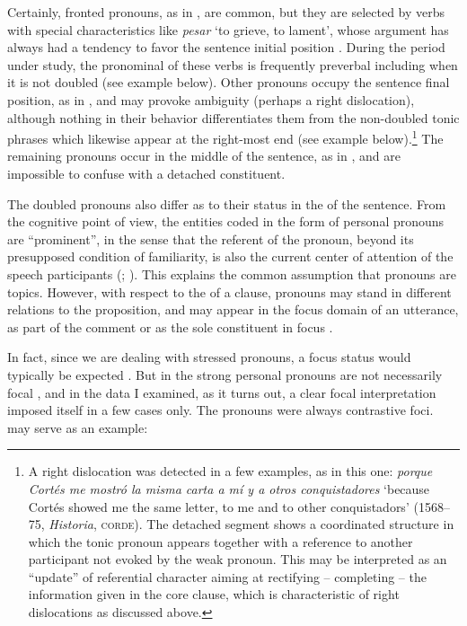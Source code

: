 \documentclass[output=paper]{LSP/langsci}
\begin{document}
 Certainly, fronted pronouns, as in , are common, but they are selected by verbs with special characteristics like \textit{pesar} ‘to grieve, to lament’, whose  argument has always had a tendency to favor the sentence initial position \citep{Melisetal2013Historical}. During the period under study, the pronominal  of these verbs is frequently preverbal including when it is not doubled (see example  below). Other pronouns occupy the sentence final position, as in , and may provoke ambiguity (perhaps a right dislocation), although nothing in their behavior differentiates them from the non-doubled tonic phrases which likewise appear at the right-most end (see example  below).\footnote{A right dislocation was detected in a few examples, as in this one: \textit{porque Cortés me mostró la misma carta a mí y a otros conquistadores} ‘because Cortés showed me the same letter, to me and to other conquistadors’ (1568–75, \textit{Historia}, \textsc{corde}). The detached segment shows a coordinated structure in which the tonic pronoun appears together with a reference to another participant not evoked by the weak pronoun. This may be interpreted as an “update” of referential character aiming at rectifying – completing – the information given in the core clause, which is characteristic of right dislocations as discussed above.} The remaining pronouns occur in the middle of the sentence, as in , and are impossible to confuse with a detached constituent.

 The doubled pronouns also differ as to their status in the  of the sentence. From the cognitive point of view, the entities coded in the form of personal pronouns are “prominent”, in the sense that the referent of the pronoun, beyond its presupposed condition of familiarity, is also the current center of attention of the speech participants (\citealt[770]{Anagnostopoulou1999Conditions}; \cf \citealt[94]{Lambrecht1994Information}). This explains the common assumption that pronouns are topics. However, with respect to the  of a clause, pronouns may stand in different relations to the proposition, and may appear in the focus domain of an utterance, as part of the comment or as the sole constituent in focus \citep[128–130]{Lambrecht1994Information}.

 In fact, since we are dealing with stressed pronouns, a focus status would typically be expected \citep[183]{Siewierska2004Person}. But in  the strong personal pronouns are not necessarily focal \citep{Lujan1999Expresion}, and in the data I examined, as it turns out, a clear focal interpretation imposed itself in a few cases only. The pronouns were always contrastive foci.  may serve as an example:
\end{document}
